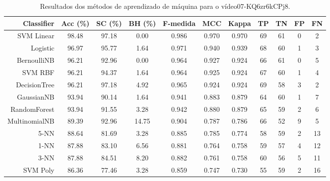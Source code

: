 \begin{table}[!htb]
\centering
\caption{Resultados dos métodos de aprendizado de máquina para o vídeo07-KQ6zr6kCPj8.}
\label{tab:07-KQ6zr6kCPj8}
\begin{tabular}{r|c|c|c|c|c|c|c|c|c|c}
\hline\hline
Classifier & Acc (\%) & SC (\%) & BH (\%) & F-medida & MCC & Kappa & TP & TN & FP & FN \\ \hline
SVM Linear & 98.48 & 97.18 & 0.00 & 0.986 & 0.970 & 0.970 & 69 & 61 & 0 & 2 \\ 
Logistic & 96.97 & 95.77 & 1.64 & 0.971 & 0.940 & 0.939 & 68 & 60 & 1 & 3 \\ 
BernoulliNB & 96.21 & 92.96 & 0.00 & 0.964 & 0.927 & 0.924 & 66 & 61 & 0 & 5 \\ 
SVM RBF & 96.21 & 94.37 & 1.64 & 0.964 & 0.925 & 0.924 & 67 & 60 & 1 & 4 \\ 
DecisionTree & 96.21 & 97.18 & 4.92 & 0.965 & 0.924 & 0.924 & 69 & 58 & 3 & 2 \\ 
GaussianNB & 93.94 & 90.14 & 1.64 & 0.941 & 0.883 & 0.879 & 64 & 60 & 1 & 7 \\ 
RandomForest & 93.94 & 91.55 & 3.28 & 0.942 & 0.880 & 0.879 & 65 & 59 & 2 & 6 \\ 
MultinomialNB & 89.39 & 92.96 & 14.75 & 0.904 & 0.787 & 0.786 & 66 & 52 & 9 & 5 \\ 
5-NN & 88.64 & 81.69 & 3.28 & 0.885 & 0.785 & 0.774 & 58 & 59 & 2 & 13 \\ 
1-NN & 87.88 & 83.10 & 6.56 & 0.881 & 0.764 & 0.758 & 59 & 57 & 4 & 12 \\ 
3-NN & 87.88 & 84.51 & 8.20 & 0.882 & 0.761 & 0.758 & 60 & 56 & 5 & 11 \\ 
SVM Poly & 86.36 & 77.46 & 3.28 & 0.859 & 0.747 & 0.730 & 55 & 59 & 2 & 16 \\ 
\hline\hline
\end{tabular}
\end{table}
